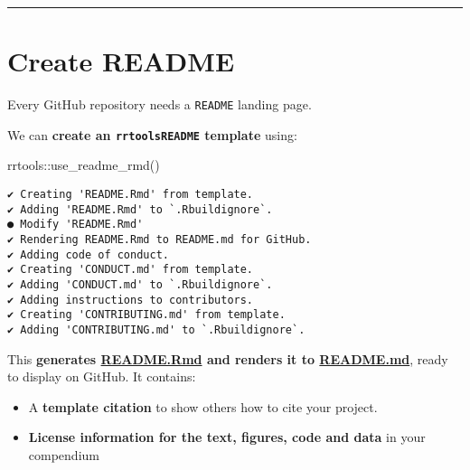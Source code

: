 \documentclass[
  letterpaper,
  DIV=11,
  numbers=noendperiod]{scrreprt}
\newenvironment{Shaded}{\begin{snugshade}}{\end{snugshade}}
\newcommand{\FunctionTok}[1]{\textcolor[rgb]{0.28,0.35,0.67}{#1}}
\newcommand{\NormalTok}[1]{\textcolor[rgb]{0.00,0.23,0.31}{#1}}
\newcommand{\SpecialCharTok}[1]{\textcolor[rgb]{0.37,0.37,0.37}{#1}}
\providecommand{\tightlist}{%
  \setlength{\itemsep}{0pt}\setlength{\parskip}{0pt}}\usepackage{longtable,booktabs,array}
\begin{document}
\begin{center}\rule{0.5\linewidth}{0.5pt}\end{center}

\hypertarget{create-readme}{%
\section{Create README}\label{create-readme}}

Every GitHub repository needs a \texttt{README} landing page.

We can \textbf{create an \texttt{rrtoolsREADME} template} using:

\begin{Shaded}
\begin{Highlighting}[]
\NormalTok{rrtools}\SpecialCharTok{::}\FunctionTok{use\_readme\_rmd}\NormalTok{()}
\end{Highlighting}
\end{Shaded}

\begin{verbatim}
✔ Creating 'README.Rmd' from template.
✔ Adding 'README.Rmd' to `.Rbuildignore`.
● Modify 'README.Rmd'
✔ Rendering README.Rmd to README.md for GitHub.
✔ Adding code of conduct.
✔ Creating 'CONDUCT.md' from template.
✔ Adding 'CONDUCT.md' to `.Rbuildignore`.
✔ Adding instructions to contributors.
✔ Creating 'CONTRIBUTING.md' from template.
✔ Adding 'CONTRIBUTING.md' to `.Rbuildignore`.
\end{verbatim}

This \textbf{generates \url{README.Rmd} and renders it to
\url{README.md}}, ready to display on GitHub. It contains:

\begin{itemize}
\tightlist
\item
  A \textbf{template citation} to show others how to cite your project.
\item
  \textbf{License information for the text, figures, code and data} in
  your compendium
\end{itemize}
\end{document}
